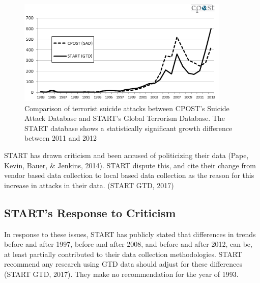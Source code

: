 \documentclass[10pt,a4paper]{article}
\begin{document}
\begin{center}
\begin{figure}[h!]
\includegraphics[width=0.9\textwidth]{backgroundpic1.png}
\caption{Comparison of terrorist suicide attacks between CPOST’s Suicide Attack Database and START’s Global Terrorism Database. The START database shows a statistically significant growth difference between 2011 and 2012}
\end{figure}
\end{center}

START has drawn criticism and been accused of politicizing their data (Pape, Kevin, Bauer, \& Jenkins, 2014). START dispute this, and cite their change from vendor based data collection to local based data collection as the reason for this increase in attacks in their data. (START GTD, 2017)

\subsection{START’s Response to Criticism}

In response to these issues, START has publicly stated that differences in trends before and after 1997, before and after 2008, and before and after 2012, can be, at least partially contributed to their data collection methodologies. START recommend any research using GTD data should adjust for these differences (START GTD, 2017). They make no recommendation for the year of 1993.
\end{document}
